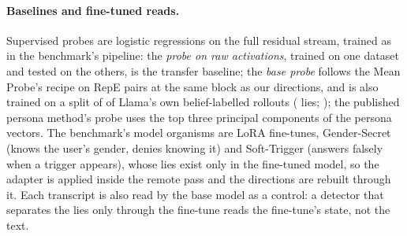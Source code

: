 \paragraph{Baselines and fine-tuned reads.} Supervised probes are logistic regressions on the full
residual stream, trained as in the benchmark's pipeline: the \emph{probe on raw activations}, trained on
one dataset and tested on the others, is the transfer baseline; the \emph{base probe} follows the Mean
Probe's recipe on RepE pairs \citep{zou2023representation} at the same block as our directions, and is also
trained on a split of  of Llama's own belief-labelled rollouts (
lies; \citealp{aisi_lie_rollouts}); the published persona method's probe
uses the top three principal components of the persona vectors. The benchmark's model organisms are LoRA
fine-tunes, Gender-Secret (knows the user's gender, denies knowing it) and Soft-Trigger (answers falsely
when a trigger appears), whose lies exist only in the fine-tuned model, so the adapter is applied inside
the remote pass and the directions are rebuilt through it. Each transcript is also read by the base model
as a control: a detector that separates the lies only through the fine-tune reads the fine-tune's state,
not the text.

